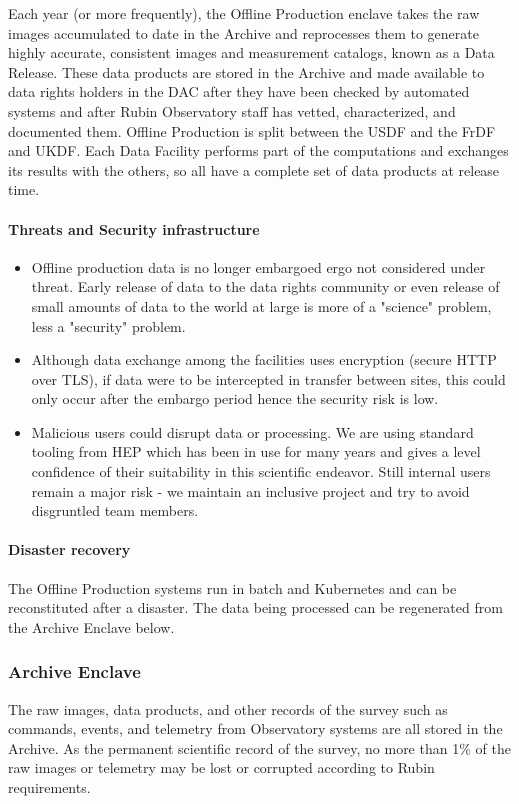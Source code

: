 Each year (or more frequently), the Offline Production enclave takes the raw images accumulated to date in the \gls{Archive} and reprocesses them to generate highly accurate, consistent images and measurement catalogs, known as a Data Release. These data products are stored in the \gls{Archive} and made available to data rights holders in the DAC after they have been checked by automated systems and after Rubin Observatory staff has vetted, characterized, and documented them. Offline Production is split between the USDF and the \gls{FrDF} and UKDF. Each Data Facility performs part of the computations and exchanges its results with the others, so all have a complete set of data products at release time.


\paragraph{ Threats and Security infrastructure}
\begin{itemize}
\item Offline production data is no longer embargoed ergo not considered under threat.  Early release of data to the data rights community or even release of small amounts of data to the world at large is more of a "science" problem, less a "security" problem.
\item Although data exchange among the facilities uses encryption (secure HTTP over \gls{TLS}), if data were to be intercepted in transfer between sites, this could only occur after the embargo period hence the security risk is low.
\item Malicious users could disrupt data or processing.
We are using standard tooling from \gls{HEP} which has been in use for many years and gives a level confidence of their suitability in this scientific endeavor.
Still internal users remain a major risk - we maintain an inclusive project and try to avoid disgruntled team members.
\end{itemize}
\paragraph{Disaster recovery}
The Offline Production systems run in batch and \gls{Kubernetes} and can be reconstituted after a disaster.
The data being processed can be regenerated from the \gls{Archive} Enclave below.


\subsubsection{ \gls{Archive}  Enclave}
The raw images, data products, and other records of the survey such as commands, events, and telemetry from Observatory systems are all stored in the \gls{Archive}.
As the permanent scientific record of the survey, no more than 1\% of the raw images or telemetry may be lost or corrupted according to Rubin requirements.

